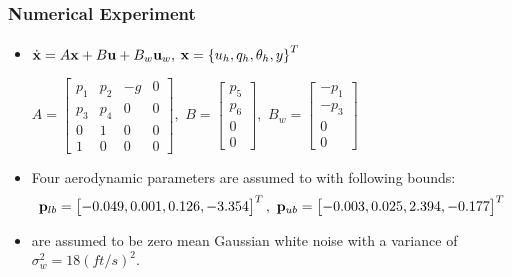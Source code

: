 \documentclass{beamer}
\begin{document}
\begin{frame}\frametitle{Numerical Experiment}\framesubtitle{\color{white}{Hovering Helicopter model}}
\begin{itemize}\vspace{-0.1in}
\item \alert{$\dot{\mathbf{x}} = A\mathbf{x}+B\mathbf{u}+B_w\mathbf{u}_w, $} $\mathbf{x}=\left\{u_h,q_h,\theta_h,y \right\}^T$

\small{$A = \begin{bmatrix} p_1 & p_2 & -g & 0\\ p_3 & p_4 & 0 & 0\\0 & 1 & 0 & 0\\1 & 0 & 0 & 0 \end{bmatrix},$ $B = \begin{bmatrix} p_5\\ p_6\\0\\0\end{bmatrix},$
$B_w = \begin{bmatrix} -p_1\\ -p_3\\0\\0\end{bmatrix}$}

\item \small{Four aerodynamic parameters are assumed to {\color{blue}{uniformly distributed}} with following bounds:}
\footnotesize{$$
\mathbf{p}_{lb} = \begin{bmatrix} -0.049, 0.001, 0.126, -3.354  \end{bmatrix}^T,\  \mathbf{p}_{ub} = \begin{bmatrix} -0.003, 0.025, 2.394, -0.177  \end{bmatrix}^T
$$}
\item \small{{\color{blue}{Modeling errors due to unsteady flow, $u_w$}} are assumed to be \alert{zero mean Gaussian white noise} with a variance of $\sigma_w^2=18 (ft/s)^2$.}
\end{itemize}
\begin{figure}\vspace{-0.2in}
\end{figure}
\end{frame}
\end{document}
